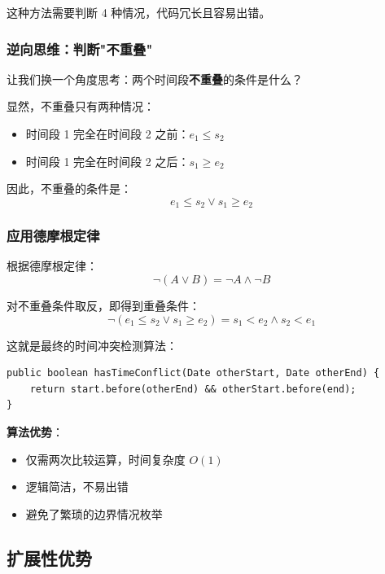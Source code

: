 \documentclass[a4paper]{article}
\begin{document}
这种方法需要判断 4 种情况，代码冗长且容易出错。

\subsubsection{逆向思维：判断"不重叠"}

让我们换一个角度思考：两个时间段\textbf{不重叠}的条件是什么？

显然，不重叠只有两种情况：
\begin{itemize}
    \item 时间段 1 完全在时间段 2 之前：$e_1 \leq s_2$
    \item 时间段 1 完全在时间段 2 之后：$s_1 \geq e_2$
\end{itemize}

因此，不重叠的条件是：
\begin{equation}
e_1 \leq s_2 \lor s_1 \geq e_2
\end{equation}

\subsubsection{应用德摩根定律}

根据德摩根定律：
\begin{equation}
\neg(A \lor B) = \neg A \land \neg B
\end{equation}

对不重叠条件取反，即得到重叠条件：
\begin{equation}
\neg(e_1 \leq s_2 \lor s_1 \geq e_2) = s_1 < e_2 \land s_2 < e_1
\end{equation}

这就是最终的时间冲突检测算法：
\begin{lstlisting}
public boolean hasTimeConflict(Date otherStart, Date otherEnd) {
    return start.before(otherEnd) && otherStart.before(end);
}
\end{lstlisting}

\textbf{算法优势}：
\begin{itemize}
    \item 仅需两次比较运算，时间复杂度 $O(1)$
    \item 逻辑简洁，不易出错
    \item 避免了繁琐的边界情况枚举
\end{itemize}

\subsection{扩展性优势}
\end{document}
